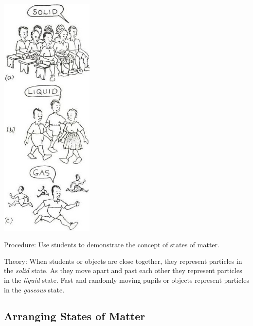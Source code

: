 \begin{multicols}{2}
\begin{center}
\includegraphics[width=0.35\textwidth]{./img/source/states-matter-students.jpg}
\end{center}

\begin{description*}
\item[Procedure:]{Use students to demonstrate the concept of states of matter.}
\item[Theory:]{When students or objects are close together, they represent particles in the \emph{solid} state. As they move apart and past each other they represent particles in the \emph{liquid} state. Fast and randomly moving pupils or objects represent particles in the \emph{gaseous} state.}
\end{description*}

\subsection{Arranging States of Matter}


\end{multicols}
